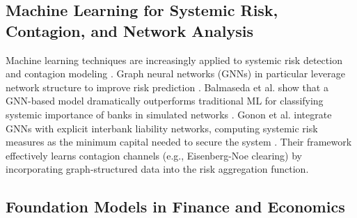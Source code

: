 \subsection{Machine Learning for Systemic Risk, Contagion, and Network Analysis}
Machine learning techniques are increasingly applied to systemic risk detection and contagion modeling \citep{BALMASEDA2023200240,gonon2025computingsystemicriskmeasures}. Graph neural networks (GNNs) in particular leverage network structure to improve risk prediction \citep{KipfWelling2017,VelickovicEtAl2018}. Balmaseda et al. show that a GNN-based model dramatically outperforms traditional ML for classifying systemic importance of banks in simulated networks \cite{BALMASEDA2023200240}. Gonon et al. integrate GNNs with explicit interbank liability networks, computing systemic risk measures as the minimum capital needed to secure the system \cite{gonon2025computingsystemicriskmeasures}. Their framework effectively learns contagion channels (e.g., Eisenberg-Noe clearing) by incorporating graph-structured data into the risk aggregation function. %

\subsection{Foundation Models in Finance and Economics}

